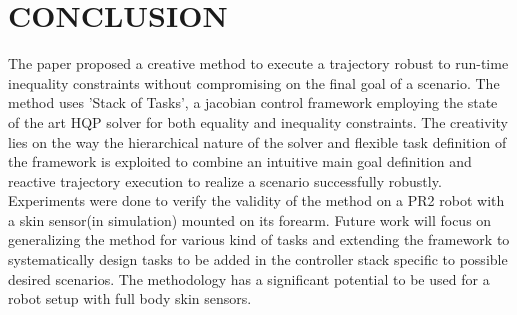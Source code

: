 \section{CONCLUSION}
The paper proposed a creative method to execute a trajectory robust to run-time inequality constraints without compromising on the final goal of a scenario. The method uses 'Stack of Tasks', a jacobian control framework employing the state of the art HQP solver for both equality and inequality constraints. The creativity lies on the way the hierarchical nature of the solver and flexible task definition of the framework is exploited to combine an intuitive main goal definition and reactive trajectory execution to realize a scenario successfully robustly. Experiments were done to verify the validity of the method on a PR2 robot with a skin sensor(in simulation) mounted on its forearm. Future work will focus on generalizing the method for various kind of tasks and extending the framework to systematically design tasks to be added in the controller stack specific to possible desired scenarios. The methodology has a significant potential to 
be used for a robot setup with full body skin sensors.